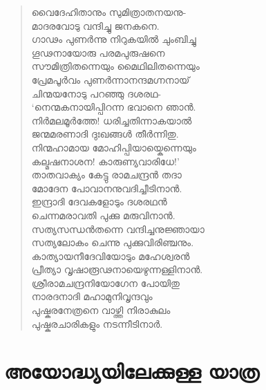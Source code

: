 \begin{verse}
വൈദേഹിതാനും സുമിത്രാതനയനു-\\
മാദരവോടു വന്ദിച്ചു ജനകനെ.\\
ഗാഢം പുണര്‍ന്നു നിറുകയില്‍ ചുംബിച്ചു\\
ഗൂഢനായോരു പരമപുരുഷനെ\\
സൗമിത്രിതന്നെയും മൈഥിലിതന്നെയും\\
പ്രേമപൂര്‍വം പുണര്‍ന്നാനന്ദമഗ്നനായ്\\
ചിന്മയനോടു പറഞ്ഞു ദശരഥ-\\
‘നെന്മകനായിപ്പിറന്ന ഭവാനെ ഞാന്‍.\\
നിര്‍മലമൂര്‍ത്തേ! ധരിച്ചതിന്നാകയാല്‍\\
ജന്മമരണാദി ദുഃഖങ്ങള്‍ തീര്‍ന്നിതു.\\
നിന്മഹാമായ മോഹിപ്പിയായ്കെന്നെയും\\
കല്മഷനാശന! കാരുണ്യവാരിധേ!’\\
താതവാക്യം കേട്ടു രാമചന്ദ്രന്‍ തദാ\\
മോദേന പോവാനനുവദിച്ചീടിനാന്‍.\\
ഇന്ദ്രാദി ദേവകളോടും ദശരഥന്‍\\
ചെന്നമരാവതി പുക്കു മരുവിനാന്‍.\\
സത്യസന്ധന്‍തന്നെ വന്ദിച്ചനുജ്ഞായാ\\
സത്യലോകം ചെന്നു പുക്കുവിരിഞ്ചനും.\\
കാത്യായനീദേവിയോടും മഹേശ്വരന്‍\\
പ്രീത്യാ വൃഷാരൂഢനായെഴുന്നള്ളിനാന്‍.\\
ശ്രീരാമചന്ദ്രനിയോഗേന പോയിതു\\
നാരദനാദി മഹാമുനിവൃന്ദവും\\
പുഷ്കരനേത്രനെ വാഴ്ത്തി നിരാകുലം\\
പുഷ്കരചാരികളും നടന്നീടിനാര്‍.
\end{verse}


\section{അയോദ്ധ്യയിലേക്കുള്ള യാത്ര}

